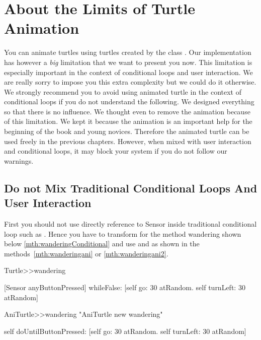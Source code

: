 \ifx\wholebook\relax\else



\fi
 
 
\chapter{About the Limits of Turtle Animation}

You can animate turtles using turtles created by the class . Our implementation has however a \emph{big} limitation that we want to present you now. This limitation is especially important in the context of conditional loops and user interaction. We are really sorry to impose you this extra complexity but we could do it otherwise. We strongly recommend you to avoid using animated turtle in the context of conditional loops if you do not understand the following. We designed everything so that there is no influence.  We thought even to remove the animation  because of this limitation. We kept it because the animation is an important help for the beginning of the book and young novices. Therefore the animated turtle can be used freely in the previous chapters. However, when mixed with user interaction and conditional loops, it may block your system if you do not follow our warnings. 


\section{Do not Mix Traditional Conditional Loops And User Interaction}

First you should not use directly reference to Sensor inside traditional conditional loop such as . Hence you have to transform for the method wandering  shown below \ref{mth:wanderingConditional} and use  and   as shown in the methods~\ref{mth:wanderingani} or \ref{mth:wanderingani2}.

\begin{method}\label{mth:wanderingConditional}
Turtle>>wandering

   [Sensor anyButtonPressed] whileFalse: 
      [self go: 30 atRandom.
      self turnLeft: 30 atRandom]
\end{method}

\begin{method}\label{mth:wanderingani}
AniTurtle>>wandering
   "AniTurtle new wandering"

   self doUntilButtonPressed: 
      [self go: 30 atRandom.
      self turnLeft: 30 atRandom]
\end{method}


